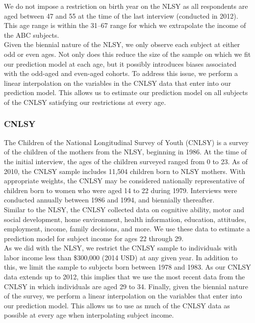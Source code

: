 \noindent We do not impose a restriction on birth year on the NLSY as all respondents are aged between 47 and 55
at the time of the last interview (conducted in 2012). This age range is within the 31--67 range for which
we extrapolate the income of the ABC subjects. \\

\noindent Given the biennial nature of the NLSY, we only observe each subject at either odd or even
ages. Not only does this reduce the size of the sample on which we fit our prediction model
at each age, but it possibly introduces biases associated with the odd-aged and even-aged cohorts.
To address this issue, we perform a linear interpolation on the variables in the CNLSY data
that enter into our prediction model. This allows us to estimate our prediction model on
all subjects of the CNLSY satisfying our restrictions at every age. \\

\subsubsection{CNLSY}
\label{app:subject_income_cnlsy}

\noindent The Children of the National Longitudinal Survey of Youth (CNLSY) is a survey of the children of the mothers from the NLSY, beginning in 1986. At the time of
the initial interview, the ages of the children surveyed ranged from 0 to 23. As of 2010,
the CNLSY sample includes 11,504 children born to NLSY mothers. With appropriate weights,
the CNLSY may be considered nationally representative of children born to women
who were aged 14 to 22 during 1979. Interviews were conducted annually between 1986 and 1994,
and biennially thereafter. \\

\noindent Similar to the NLSY, the CNLSY collected data on cognitive ability, motor and social development,
home environment, health information, education, attitudes, employment, income, family decisions,
and more. We use these data to estimate a prediction model for subject income for ages
22 through 29. \\

\noindent As we did with the NLSY, we restrict the CNLSY sample to individuals with labor income less than
\$300,000 (2014 USD) at any given year. In addition to this, we limit the sample to subjects born
between 1978 and 1983. As our CNLSY data extends up to 2012, this implies that we use the most
recent data from the CNLSY in which individuals are aged 29 to 34. Finally, given the biennial
nature of the survey, we perform a linear interpolation on the variables that enter into our prediction
model. This allows us to use as much of the CNLSY data as possible at every age when
interpolating subject income. \\


